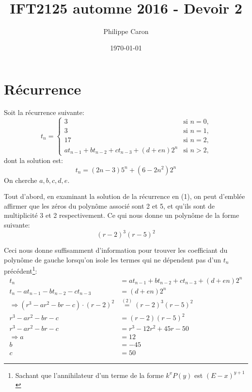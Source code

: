 \documentclass{article}
\title{IFT2125 automne 2016 - Devoir 2} %
\author{Philippe Caron}
\date{\today}
\begin{document}
\maketitle
\section{Récurrence}
Soit la récurrence suivante:
$$
t_n =
\begin{cases}
  3 & \text{si } n = 0 \text{,}\\
  3 & \text{si } n = 1 \text{,}\\
  17 & \text{si } n = 2 \text{,}\\
  at_{n-1} + bt_{n-2} + ct_{n-3} + (d + en)2^n & \text{si } n > 2 \text{,}
\end{cases}
$$
dont la solution est:
\begin{equation}
  t_n = (2n - 3)5^n + (6 - 2n^2)2^n
\end{equation}
On cherche $a, b, c, d, e$.

Tout d'abord, en examinant la solution de la récurrence en (1), on peut d'emblée affirmer que les zéros du polynôme associé sont 2 et 5, et qu'ils sont de multiplicité 3 et 2 respectivement. Ce qui nous donne un polynôme de la forme suivante:
\begin{equation}
  (r-2)^3(r-5)^2
\end{equation}

Ceci nous donne suffisamment d'information pour trouver les coefficiant du polynôme de gauche lorsqu'on isole les termes qui ne dépendent pas d'un $t_n$ précédent\footnote{Sachant que l'annihilateur d'un terme de la forme $k^xP(y)$ est $(E-x)^{y+1}$}:
\begin{align*}
  t_n &= at_{n-1} + bt_{n-2} + ct_{n-3} + (d + en)2^n\\
  t_n - at_{n-1} - bt_{n-2} - ct_{n-3} &= (d + en)2^n\\
  \Rightarrow (r^3 - ar^2 - br - c) \cdot (r-2)^2
  &\stackrel{(2)}{=} (r-2)^3(r-5)^2\\
  r^3 - ar^2 - br - c &= (r-2)(r-5)^2\\
  r^3 - ar^2 - br - c &= r^3 - 12r^2 + 45r -50\\
  \Rightarrow a &= 12\\
  b &= -45\\
  c &= 50
\end{align*}
\end{document}
